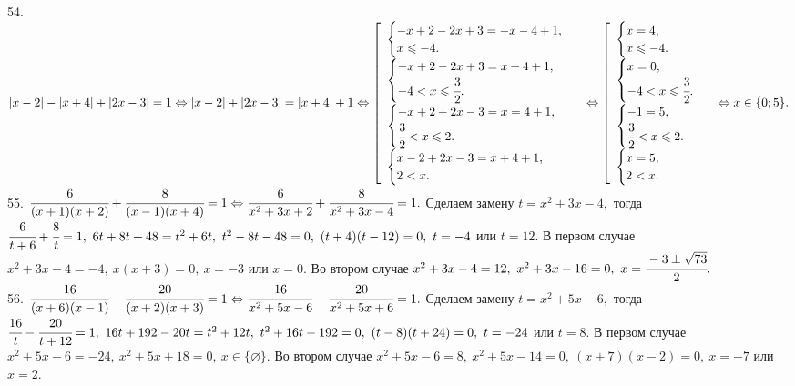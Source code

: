 54. $|x-2|-|x+4|+|2x-3|=1\Leftrightarrow|x-2|+|2x-3|=|x+4|+1\Leftrightarrow \left[\begin{array}{l}\begin{cases} -x+2-2x+3=-x-4+1,\\ x\leqslant-4.\end{cases}\\
\begin{cases} -x+2-2x+3=x+4+1,\\ -4<x\leqslant\cfrac{3}{2}.\end{cases}\\ \begin{cases} -x+2+2x-3=x=4+1,\\ \cfrac{3}{2}<x\leqslant2.\end{cases}\\
\begin{cases} x-2+2x-3=x+4+1,\\ 2<x.\end{cases}\end{array}\right.\Leftrightarrow \left[\begin{array}{l}\begin{cases} x=4,\\ x\leqslant-4.\end{cases}\\
\begin{cases} x=0,\\ -4<x\leqslant\cfrac{3}{2}.\end{cases}\\ \begin{cases} -1=5,\\ \cfrac{3}{2}<x\leqslant2.\end{cases}\\
\begin{cases} x=5,\\ 2< x.\end{cases}\end{array}\right.\Leftrightarrow x\in\{0; 5\}.$\\
55. $\cfrac{6}{(x+1)(x+2)}+\cfrac{8}{(x-1)(x+4)}=1\Leftrightarrow \cfrac{6}{x^2+3x+2}+\cfrac{8}{x^2+3x-4}=1.$ Сделаем замену $t=x^2+3x-4,$ тогда $\cfrac{6}{t+6}+\cfrac{8}{t}=1,\ 6t+8t+48=t^2+6t,\ t^2-8t-48=0,\ (t+4)(t-12)=0,\ t=-4$ или $t=12.$ В первом случае $x^2+3x-4=-4,\ x(x+3)=0,\ x=-3$ или $x=0.$ Во втором случае $x^2+3x-4=12,\ x^2+3x-16=0,\ x=\cfrac{-3\pm\sqrt{73}}{2}.$\\
56. $\cfrac{16}{(x+6)(x-1)}-\cfrac{20}{(x+2)(x+3)}=1\Leftrightarrow\cfrac{16}{x^2+5x-6}-\cfrac{20}{x^2+5x+6}=1.$ Сделаем замену $t=x^2+5x-6,$ тогда $\cfrac{16}{t}-\cfrac{20}{t+12}=1,\ 16t+192-20t=t^2+12t,\ t^2+16t-192=0,\ (t-8)(t+24)=0,\ t=-24$ или $t=8.$ В первом случае $x^2+5x-6=-24,\ x^2+5x+18=0,\ x\in\{\varnothing\}.$ Во втором случае $x^2+5x-6=8,\ x^2+5x-14=0,\ (x+7)(x-2)=0,\ x=-7$ или $x=2.$\\
